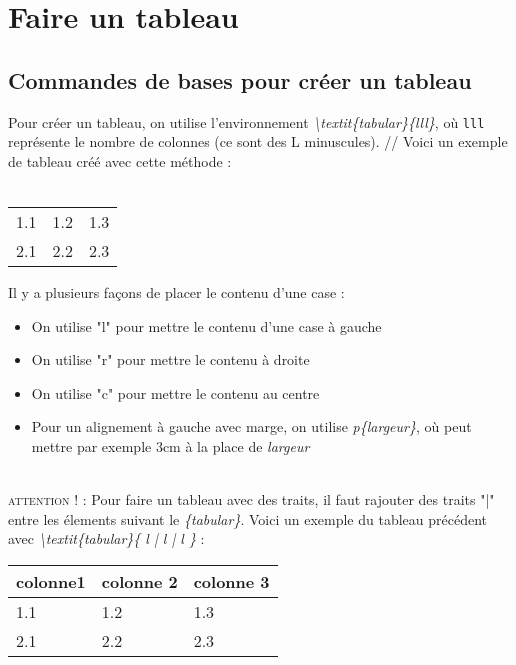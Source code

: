 \documentclass[a4paper, 8pt]{article}
\begin{document}
\section{Faire un tableau}
\subsection{Commandes de bases pour créer un tableau}
Pour créer un tableau, on utilise l'environnement \textit{\textbackslash textit\{tabular\}\{lll\}}, où \texttt{lll} représente le nombre de colonnes (ce sont des L minuscules). //
Voici un exemple de tableau créé avec cette méthode : \\ \\

\begin{tabular}{lll}
   1.1 & 1.2 & 1.3 \\
   2.1 & 2.2 & 2.3 \\
\end{tabular}

Il y a plusieurs façons de placer le contenu d'une case :
\begin{itemize}

\item On utilise "l" pour mettre le contenu d'une case à gauche
\item On utilise "r" pour mettre le contenu à droite
\item On utilise "c" pour mettre le contenu au centre
\item Pour un alignement à gauche avec marge, on utilise \textit{p\{largeur\}}, où peut mettre par exemple 3cm à la place de \textit{largeur}\\ \\

\end{itemize} 

\textsc{attention !} : Pour faire un tableau avec des traits, il faut rajouter des traits "|" entre les élements suivant le \textit{\{tabular\}}. Voici un exemple du tableau précédent avec \textit{\textbackslash textit\{tabular\}\{ l | l | l \}} : \\

\begin{tabular}{l | l | l }
	\hline 
	colonne1 & colonne 2 & colonne 3 \\
	\hline \hline
   1.1 & 1.2 & 1.3 \\
   2.1 & 2.2 & 2.3 \\
	\hline
\end{tabular}\\ \\
\end{document}
